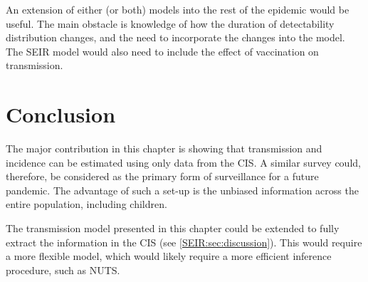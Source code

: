 \documentclass[thesis.tex]{subfiles}
\begin{document}
An extension of either (or both) models into the rest of the epidemic would be useful.
The main obstacle is knowledge of how the duration of detectability distribution changes, and the need to incorporate the changes into the model.
The SEIR model would also need to include the effect of vaccination on transmission.


\section{Conclusion}

The major contribution in this chapter is showing that transmission and incidence can be estimated using only data from the CIS.
A similar survey could, therefore, be considered as the primary form of surveillance for a future pandemic.
The advantage of such a set-up is the unbiased information across the entire population, including children.

The transmission model presented in this chapter could be extended to fully extract the information in the CIS (see \cref{SEIR:sec:discussion}).
This would require a more flexible model, which would likely require a more efficient inference procedure, such as NUTS.

\ifSubfilesClassLoaded{
  \appendix
  
  
  
  \listoftodos
}{}
\end{document}
